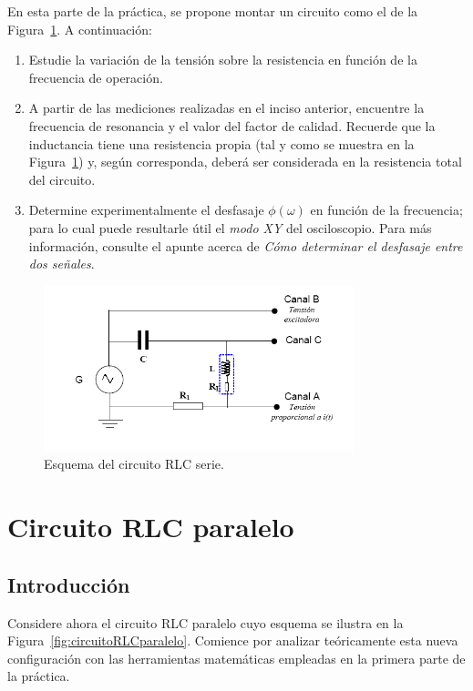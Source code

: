 \documentclass[laboratorio]{guia}
\begin{document}
En esta parte de la pr\'actica, se propone montar un circuito como el de la
Figura~\ref{fig:circuitoRLCserie}. A continuaci\'on:
\begin{enumerate}
    \item Estudie la variaci\'on de la tensi\'on sobre la resistencia en 
        funci\'on de la frecuencia de operaci\'on. 
    \item A partir de las mediciones realizadas en el inciso anterior,
        encuentre la frecuencia de resonancia y el valor del factor de
        calidad. Recuerde que la inductancia tiene una resistencia propia 
        (tal y como se muestra
        en la Figura~\ref{fig:circuitoRLCserie}) y, seg\'un corresponda,
        deber\'a ser considerada en la resistencia total del circuito.
    \item Determine experimentalmente el desfasaje $\phi(\omega)$ en funci\'on 
        de la frecuencia; para lo cual puede resultarle \'util el {\it modo XY}
        del osciloscopio. Para m\'as informaci\'on, consulte el apunte acerca
        de {\it C\'omo determinar el desfasaje entre dos se\~nales}.
\end{enumerate}

\begin{figure}[t!]
    \centering
    \includegraphics[width=9cm]{LG06--000.png}
    \caption{Esquema del circuito RLC serie.}
    \label{fig:circuitoRLCserie}
\end{figure}

\section{Circuito RLC paralelo}

\subsection{Introducci\'on}

Considere ahora el circuito RLC paralelo cuyo esquema se ilustra en la 
Figura~\ref{fig:circuitoRLCparalelo}. Comience por analizar te\'oricamente
esta nueva configuraci\'on con las herramientas matem\'aticas empleadas
en la primera parte de la pr\'actica. 
\end{document}
